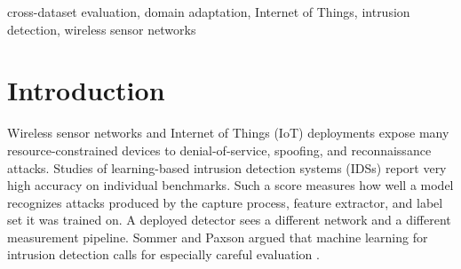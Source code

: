 \documentclass[conference]{IEEEtran}
\begin{document}
\begin{abstract}
Intrusion detection models are usually trained and tested on a single benchmark, which says little about how they behave on traffic from another network. We measure this on three public wireless and Internet of Things security datasets, WSN-DS, CICIoT2023, and Edge-IIoTset, after mapping their attack labels to a shared five-class taxonomy. The models are Random Forest and XGBoost baselines, a hybrid convolutional-recurrent model with self-attention, and a domain adversarial neural network that reuses the hybrid encoder and is trained on pooled data from two of the datasets. Each model is scored on held-out test data from the datasets it was trained on. Random Forest and the hybrid model are also trained on each dataset and tested on the other two. Same-dataset accuracy ranges from 91.9\% to 99.6\%. Cross-dataset accuracy is at most 67.6\% for Random Forest and 80.7\% for the hybrid model, and every Random Forest transfer score falls below the share of the largest class in the target test set. On Edge-IIoTset, Random Forest reaches 92.1\% accuracy but only 65.9\% macro-F1. The adversarial model scores 1.1 to 1.3 points below the hybrid model trained on each dataset separately. Scoring protocols differ between models, and we list each difference. For these datasets, same-dataset accuracy alone is not sufficient evidence, and a transfer claim needs matched scoring protocols, per-class metrics, and repeated runs.
\end{abstract}

\begin{IEEEkeywords}
cross-dataset evaluation, domain adaptation, Internet of Things, intrusion detection, wireless sensor networks
\end{IEEEkeywords}

\section{Introduction}
Wireless sensor networks and Internet of Things (IoT) deployments expose many resource-constrained devices to denial-of-service, spoofing, and reconnaissance attacks. Studies of learning-based intrusion detection systems (IDSs) report very high accuracy on individual benchmarks. Such a score measures how well a model recognizes attacks produced by the capture process, feature extractor, and label set it was trained on. A deployed detector sees a different network and a different measurement pipeline. Sommer and Paxson argued that machine learning for intrusion detection calls for especially careful evaluation \cite{sommer2010}.
\end{document}
